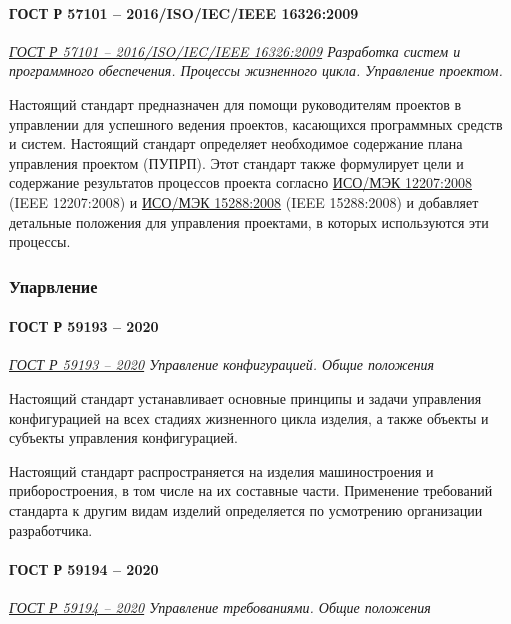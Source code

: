 \paragraph{ГОСТ Р 57101 -- 2016/ISO/IEC/IEEE 16326:2009}

\emph{\href{https://docs.cntd.ru/document/1200139543}
{ГОСТ Р 57101 -- 2016/ISO/IEC/IEEE 16326:2009}
Разработка систем и программного обеспечения.
Процессы жизненного цикла. Управление проектом.
}

Настоящий стандарт предназначен для помощи руководителям проектов
в управлении для успешного ведения проектов,
касающихся программных средств и систем.
Настоящий стандарт определяет необходимое содержание
плана управления проектом (ПУПРП).
Этот стандарт также формулирует цели и содержание результатов процессов
проекта согласно
\href{https://docs.cntd.ru/document/1200082859}{ИСО/МЭК 12207:2008}
(IEEE 12207:2008)
и \href{https://docs.cntd.ru/document/1200045267}{ИСО/МЭК 15288:2008}
(IEEE 15288:2008)
и добавляет детальные положения для управления проектами,
в которых используются эти процессы.

\subsubsection{Упарвление}

\paragraph{ГОСТ Р 59193 -- 2020}

\emph{\href{https://docs.cntd.ru/document/1200177489}{ГОСТ Р 59193 -- 2020}
Управление конфигурацией. Общие положения
}

Настоящий стандарт устанавливает основные принципы
и задачи управления конфигурацией на всех стадиях жизненного цикла изделия,
а также объекты и субъекты управления конфигурацией.

Настоящий стандарт распространяется на изделия машиностроения
и приборостроения, в том числе на их составные части.
Применение требований стандарта к другим видам изделий определяется
по усмотрению организации разработчика.

\paragraph{ГОСТ Р 59194 -- 2020}

\emph{\href{https://docs.cntd.ru/document/573219705}{ГОСТ Р 59194 -- 2020}
Управление требованиями. Общие положения
}

